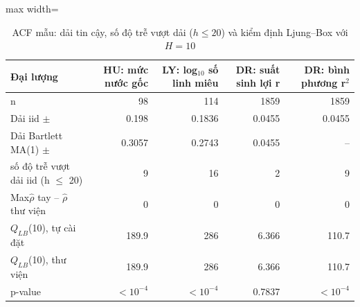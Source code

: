 \begin{table}[H]
\centering\small
\caption{ACF mẫu: dải tin cậy, số độ trễ vượt dải ($h\le20$) và kiểm định Ljung–Box với $H=10$}\label{tab:tab_b11_04_acf_ljungbox}
\begin{adjustbox}{max width=\linewidth}
\begin{tabular}{lrrrr}
\toprule
Đại lượng & HU: mức nước gốc & LY: log$_{10}$ số linh miêu & DR: suất sinh lợi r & DR: bình phương r$^{2}$ \\
\midrule
n & 98 & 114 & 1859 & 1859 \\
Dải iid $\pm$ & 0.198 & 0.1836 & 0.0455 & 0.0455 \\
Dải Bartlett MA(1) $\pm$ & 0.3057 & 0.2743 & 0.0455 & – \\
số độ trễ vượt dải iid (h $\le$ 20) & 9 & 16 & 2 & 9 \\
Max\textbar{}$\hat{\rho}$ tay – $\hat{\rho}$ thư viện\textbar{} & 0 & 0 & 0 & 0 \\
$Q_{LB}$(10), tự cài đặt & 189.9 & 286 & 6.366 & 110.7 \\
$Q_{LB}$(10), thư viện & 189.9 & 286 & 6.366 & 110.7 \\
p-value & $<10^{-4}$ & $<10^{-4}$ & 0.7837 & $<10^{-4}$ \\
\bottomrule
\end{tabular}
\end{adjustbox}\par{}
\end{table}
